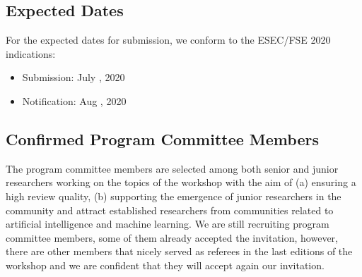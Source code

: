 \subsection{Expected Dates}

For the expected dates for submission, we conform to the ESEC/FSE 2020 indications:
\begin{itemize}[topsep=0.5em, itemsep=0.5em]
	\item Submission: July , 2020
	\item Notification: Aug , 2020
\end{itemize}


\subsection{Confirmed Program Committee Members}
The program committee members are selected among both senior and junior researchers working on the topics of the workshop with the aim of (a) ensuring a high review quality, (b) supporting the emergence of junior researchers in the community and attract established researchers from communities related to artificial intelligence and machine learning.
We are still recruiting program committee members, some of them already accepted the invitation, however, there are other members that nicely served as referees in the last editions of the workshop and we are confident that they will accept again our invitation.

